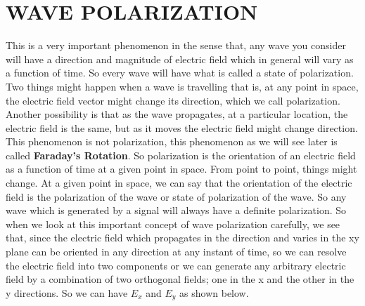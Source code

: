 \section{WAVE POLARIZATION}
This is a very important phenomenon in the sense that, any wave you consider will have a direction and magnitude of electric field which in general will vary as a function of time. So every wave will have what is called a state of polarization. Two things might happen when a wave is travelling that is, at any point in space, the electric field vector might change its direction, which we call polarization. Another possibility is that as the wave propagates, at a particular location, the electric field is the same, but as it moves the electric field might change direction. This phenomenon is not polarization, this phenomenon as we will see later is called \textbf{Faraday's Rotation}. So polarization is the orientation of an electric field as a function of time at a given point in space. From point to point, things might change. At a given point in space, we can say that the orientation of the electric field is the polarization of the wave or state of polarization of the wave. So any wave which is generated by a signal will always have a definite polarization. So when we look at this important concept of wave polarization carefully, we see that, since the electric field which propagates in the direction and varies in the xy plane can be oriented in any direction at any instant of time, so we can resolve the electric field into two components or we can generate any arbitrary electric field by a combination of two orthogonal fields; one in the x and the other in the y directions. So we can have $E_x$ and $E_y$ as shown below. 

